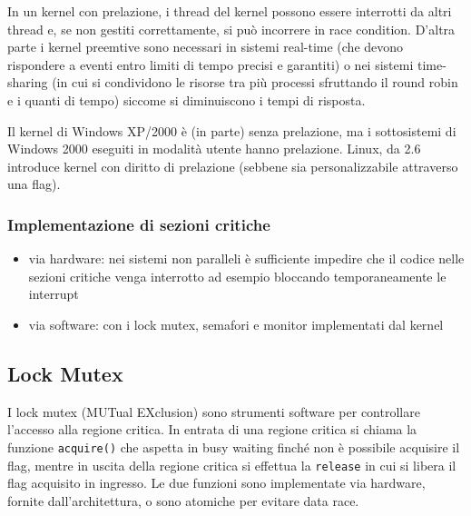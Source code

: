 \documentclass[a4paper]{article}
\begin{document}
In un kernel con prelazione, i thread del kernel possono essere interrotti da altri thread e, se non gestiti correttamente, si
può incorrere in race condition. D'altra parte i kernel preemtive sono necessari in sistemi real-time (che devono rispondere a
eventi entro limiti di tempo precisi e garantiti) o nei sistemi time-sharing (in cui si condividono le risorse tra più processi
sfruttando il round robin e i quanti di tempo) siccome si diminuiscono i tempi di risposta.

Il kernel di Windows XP/2000 è (in parte) senza prelazione, ma i sottosistemi di Windows 2000 eseguiti in modalità utente hanno
prelazione. Linux, da 2.6 introduce kernel con diritto di prelazione (sebbene sia personalizzabile attraverso una flag).

\subsubsection*{Implementazione di sezioni critiche}
\begin{itemize}
	\item via hardware: nei sistemi non paralleli è sufficiente impedire che il codice nelle sezioni critiche venga interrotto
	ad esempio bloccando temporaneamente le interrupt
	\item via software: con i lock mutex, semafori e monitor implementati dal kernel
\end{itemize}


\subsection{Lock Mutex}
I lock mutex (MUTual EXclusion) sono strumenti software per controllare l'accesso alla regione critica. In entrata di una regione
critica si chiama la funzione \verb|acquire()| che aspetta in busy waiting finché non è possibile acquisire il flag, mentre in
uscita della regione critica si effettua la \verb|release| in cui si libera il flag acquisito in ingresso. Le due funzioni sono
implementate via hardware, fornite dall'architettura, o sono atomiche per evitare data race.
\end{document}
